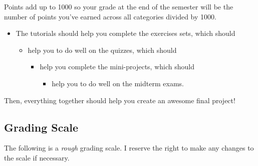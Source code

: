 \documentclass[
]{book}
\providecommand{\tightlist}{%
  \setlength{\itemsep}{0pt}\setlength{\parskip}{0pt}}
\begin{document}
Points add up to 1000 so your grade at the end of the semester will be the number of points you've earned across all categories divided by 1000.

\begin{itemize}
\tightlist
\item
  The tutorials should help you complete the exercises sets, which should

  \begin{itemize}
  \tightlist
  \item
    help you to do well on the quizzes, which should

    \begin{itemize}
    \tightlist
    \item
      help you complete the mini-projects, which should

      \begin{itemize}
      \tightlist
      \item
        help you to do well on the midterm exams.
      \end{itemize}
    \end{itemize}
  \end{itemize}
\end{itemize}

Then, everything together should help you create an awesome final project!

\hypertarget{grading-scale}{%
\subsection{Grading Scale}\label{grading-scale}}

The following is a \emph{rough} grading scale. I reserve the right to make any changes to the scale if necessary.
\end{document}
